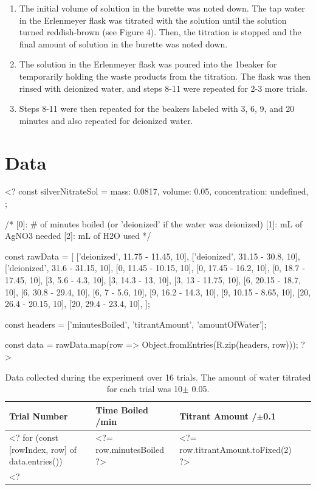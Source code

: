 \documentclass[11pt]{article}
\begin{document}
\begin{enumerate}
	\item The initial volume of  solution in the burette was noted down. The tap water in the Erlenmeyer flask was titrated with the  solution until the solution turned reddish-brown (see Figure 4). Then, the titration is stopped and the final amount of  solution in the burette was noted down.

	\item The solution in the Erlenmeyer flask was poured into the 1\litre beaker for temporarily holding the waste products from the titration. The flask was then rinsed with deionized water, and steps 8-11 were repeated for 2-3 more trials.

	\item Steps 8-11 were then repeated for the beakers labeled with 3, 6, 9, and 20 minutes and also repeated for deionized water.
\end{enumerate}

\section{Data}

<?
const silverNitrateSol = {
	mass: 0.0817,
	volume: 0.05,
	concentration: undefined,
};

/*
[0]: # of minutes boiled (or 'deionized' if the water was deionized)
[1]: mL of AgNO3 needed
[2]: mL of H2O used
*/

const rawData = [
	['deionized', 11.75 - 11.45, 10],
	['deionized', 31.15 - 30.8, 10],
	['deionized', 31.6 - 31.15, 10],
	[0, 11.45 - 10.15, 10],
	[0, 17.45 - 16.2, 10],
	[0, 18.7 - 17.45, 10],
	[3, 5.6 - 4.3, 10],
	[3, 14.3 - 13, 10],
	[3, 13 - 11.75, 10],
	[6, 20.15 - 18.7, 10],
	[6, 30.8 - 29.4, 10],
	[6, 7 - 5.6, 10],
	[9, 16.2 - 14.3, 10],
	[9, 10.15 - 8.65, 10],
	[20, 26.4 - 20.15, 10],
	[20, 29.4 - 23.4, 10],
];

const headers = ['minutesBoiled', 'titrantAmount', 'amountOfWater'];

const data = rawData.map(row => Object.fromEntries(R.zip(headers, row)));
?>

\begin{table}[H]
	\caption{Data collected during the experiment over 16 trials. The amount of water titrated for each trial was 10\ml $\pm$ 0.05\ml .}
	\def\arraystretch{1.5}
	\begin{tabularx}{\linewidth}{|
			>{\RaggedRight}X|
			>{\RaggedRight}X|
			>{\RaggedRight}X|
			>{\RaggedRight}X|
		}
		\hline
		\textbf{Trial Number}                &
		\textbf{Time Boiled} /\si{\minute}   &
		\textbf{Titrant Amount} /$\pm$0.1\ml
		\\\hline
		<? for (const [rowIndex, row] of data.entries()) { ?>
			Trial <?= rowIndex + 1 ?>
			& <?= row.minutesBoiled ?>
			& <?= row.titrantAmount.toFixed(2) ?>
			\\\hline
		<? } ?>
	\end{tabularx}
\end{table}
\end{document}
